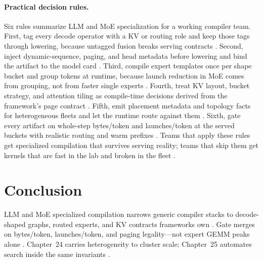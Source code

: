 \paragraph{Practical decision rules.}
Six rules summarize LLM and MoE specialization for a working compiler team. First, tag every decode operator with a KV or routing role and keep those tags through lowering, because untagged fusion breaks serving contracts \citep{kwon2023vllm,chen2020compilerbasedhardw}. Second, inject dynamic-sequence, paging, and head metadata before lowering and bind the artifact to the model card \citep{patel2025llminference,memoryfloor2026}. Third, compile expert templates once per shape bucket and group tokens at runtime, because launch reduction in MoE comes from grouping, not from faster single experts \citep{liu2024deepseekv3,taxbreak2026}. Fourth, treat KV layout, bucket strategy, and attention tiling as compile-time decisions derived from the framework's page contract \citep{kwon2023vllm,memoryfloor2026}. Fifth, emit placement metadata and topology facts for heterogeneous fleets and let the runtime route against them \citep{liu2024deepseekv3,patel2025llminference}. Sixth, gate every artifact on whole-step bytes/token and launches/token at the served buckets with realistic routing and warm prefixes \citep{memoryfloor2026,patel2025llminference}. Teams that apply these rules get specialized compilation that survives serving reality; teams that skip them get kernels that are fast in the lab and broken in the fleet \citep{taxbreak2026,memoryfloor2026}.

\section{Conclusion}
\label{sec:ch23_conclusion}

LLM and MoE specialized compilation narrows generic compiler stacks to decode-shaped graphs, routed experts, and KV contracts frameworks own \citep{kwon2023vllm,liu2024deepseekv3,dao2022flashattention,yirage2026,chen2020compilerbasedhardw,patel2025llminference,memoryfloor2026,taxbreak2026,amd2024aie,dlbook,dao2023flashdecoding,nvidia2024cudagraphs,nvidia2022hopper,semianalysis2024tma,amd2024xdna}. Gate merges on bytes/token, launches/token, and paging legality---not expert GEMM peaks alone \citep{taxbreak2026,patel2025llminference,liu2024deepseekv3,yirage2026,chen2020compilerbasedhardw,kwon2023vllm,memoryfloor2026,amd2024aie,dlbook,dao2022flashattention,dao2023flashdecoding,nvidia2024cudagraphs,nvidia2022hopper,semianalysis2024tma,amd2024xdna}. Chapter~24 carries heterogeneity to cluster scale; Chapter~25 automates search inside the same invariants \citep{chen2020compilerbasedhardw,yirage2026,patel2025llminference,kwon2023vllm,liu2024deepseekv3,memoryfloor2026,taxbreak2026,amd2024aie,dlbook,semianalysis2024tma,amd2024xdna,dao2022flashattention,dao2023flashdecoding,nvidia2024cudagraphs,nvidia2022hopper}.

